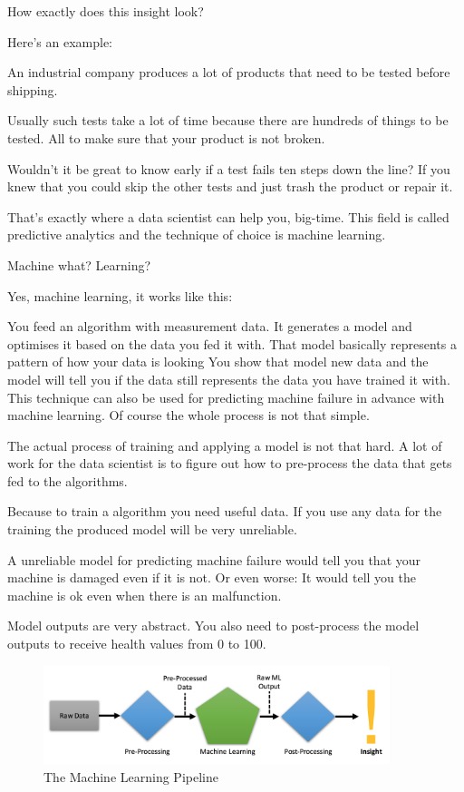 \documentclass[12pt, numbers=noenddot]{scrreprt} %
\begin{document}
How exactly does this insight look?

Here’s an example:

An industrial company produces a lot of products that need to be tested before shipping.

Usually such tests take a lot of time because there are hundreds of things to be tested. All to make sure that your product is not broken.

Wouldn’t it be great to know early if a test fails ten steps down the line? If you knew that you could skip the other tests and just trash the product or repair it.

That’s exactly where a data scientist can help you, big-time. This field is called predictive analytics and the technique of choice is machine learning.

Machine what? Learning?

Yes, machine learning, it works like this:

You feed an algorithm with measurement data.
It generates a model and optimises it based on the data you fed it with. That model basically represents a pattern of how your data is looking
You show that model new data and the model will tell you if the data still represents the data you have trained it with.
This technique can also be used for predicting machine failure in advance with machine learning. Of course the whole process is not that simple.

The actual process of training and applying a model is not that hard. A lot of work for the data scientist is to figure out how to pre-process the data that gets fed to the algorithms.

Because to train a algorithm you need useful data. If you use any data for the training the produced model will be very unreliable.

A unreliable model for predicting machine failure would tell you that your machine is damaged even if it is not. Or even worse: It would tell you the machine is ok even when there is an malfunction.

Model outputs are very abstract. You also need to post-process the model outputs to receive health values from 0 to 100.

\begin{figure}[htbp]
  \centering
     \includegraphics[width=0.9\textwidth]{images/Machine-Learning-Pipeline}
  \caption{The Machine Learning Pipeline}
  \label{fig:Bild1}
\end{figure}
\end{document}

